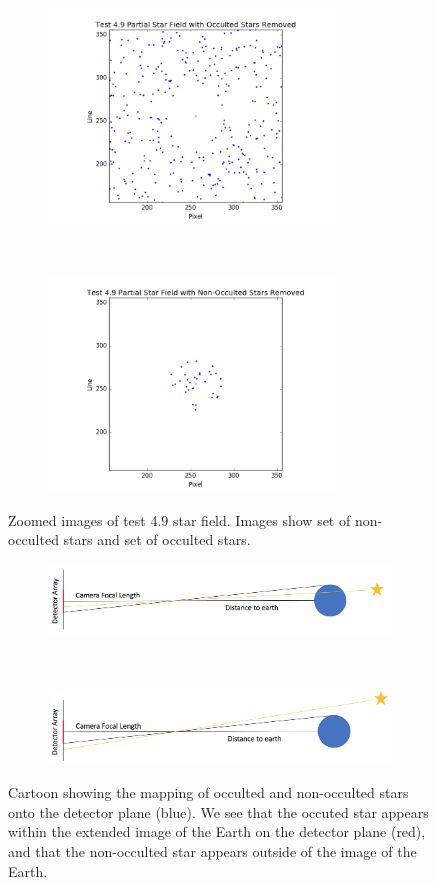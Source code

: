 \documentclass[]{DINOReportMemo}
\begin{document}
\begin{figure}[t!]
    \centering
    \begin{subfigure}
        \centering
        \includegraphics[height=2.25in]{partialWithHole}
    \end{subfigure}%
    ~ 
    \begin{subfigure}
        \centering
        \includegraphics[height=2.25in]{partialWithFill}
    \end{subfigure}

    \caption{Zoomed images of test 4.9 star field. Images show set of non-occulted stars and set of occulted stars.}
    \label{512}
\end{figure}
\begin{figure}[t!]
    \centering
    \begin{subfigure}
        \centering
        \includegraphics[width=6in]{occultedStar}
    \end{subfigure}%
    ~ 
    \begin{subfigure}
        \centering
        \includegraphics[width=6in]{nonOccultedStar}
    \end{subfigure}

    \caption{Cartoon showing the mapping of occulted and non-occulted stars onto the detector plane (blue). We see that the occuted star appears within the extended image of the Earth on the detector plane (red), and that the non-occulted star appears outside of the image of the Earth.}
    \label{512}
\end{figure}
\end{document}
